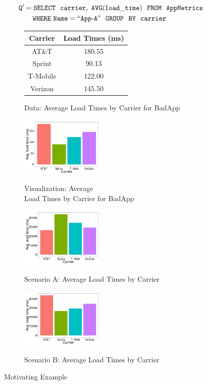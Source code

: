 \noindent
\begin{align*}
& \tt Q' = SELECT \ \ carrier,\ AVG(load\_time) \ \ FROM \ \  AppMetrics \\
& \tt \hspace{20pt} WHERE\ Name=``App\text{-}A" \ \ GROUP  \ \ BY \ \ carrier
\end{align*}

\begin{figure}[h]
\vspace{-10pt}
	\centering
	\begin{subfigure}{0.49\linewidth}
	   \begin{tabular}{cc} \hline
		  Carrier & Load Times (ms) \\ \hline
		  AT\&T & 180.55 \\ \hline
		  Sprint & 90.13 \\ \hline
		  T-Mobile & 122.00 \\ \hline
		  Verizon &  145.50\\ \hline
		  \end{tabular}
		  \caption{Data: Average Load Times by Carrier for BadApp} \label{tab:staplerX}
	\end{subfigure}
	\begin{subfigure}{0.49\linewidth}
		\centering
		{\includegraphics[width=4cm] {Images/dist1.pdf}}
		\caption{Visualization: Average \\ Load Times by Carrier
		 for BadApp}
		\label{fig:staplerX}
	\end{subfigure}
	
	\centering
	\begin{subfigure}{0.49\linewidth}
		{\includegraphics[width=4cm] {Images/dist2.pdf}}
		\caption{Scenario A: Average Load Times by Carrier}
		\label{fig:staplerX-a}
	\end{subfigure}
	\begin{subfigure}{0.49\linewidth}
		\centering
		{\includegraphics[width=4cm] {Images/dist3.pdf}}
		\caption{Scenario B: Average Load Times by Carrier}
		\label{fig:staplerX-b}
	\end{subfigure}
	\vspace{-10pt}
	\caption{Motivating Example}
	\label{fig:intro}
	\vspace{-10pt}
\end{figure}

